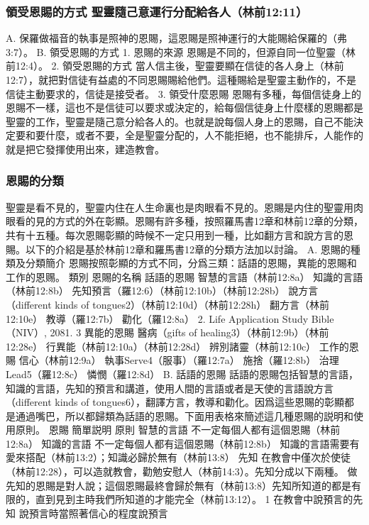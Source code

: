 \subsubsection{領受恩賜的方式 聖靈隨己意運行分配給各人（林前12:11）}
A. 保羅做福音的執事是照神的恩賜，這恩賜是照神運行的大能賜給保羅的（弗3:7）。
B. 領受恩賜的方式
1. 恩賜的來源
恩賜是不同的，但源自同一位聖靈（林前12:4）。
2. 領受恩賜的方式
當人信主後，聖靈要顯在信徒的各人身上（林前12:7），就把對信徒有益處的不同恩賜賜給他們。這種賜給是聖靈主動作的，不是信徒主動要求的，信徒是接受者。
3. 領受什麼恩賜
恩賜有多種，每個信徒身上的恩賜不一樣，這也不是信徒可以要求或決定的，給每個信徒身上什麼樣的恩賜都是聖靈的工作，聖靈是隨己意分給各人的。也就是說每個人身上的恩賜，自己不能決定要和要什麼，或者不要，全是聖靈分配的，人不能拒絕，也不能排斥，人能作的就是把它發揮使用出來，建造教會。
\subsubsection{恩賜的分類}
聖靈是看不見的，聖靈内住在人生命裏也是肉眼看不見的。恩賜是内住的聖靈用肉眼看的見的方式的外在彰顯。恩賜有許多種，按照羅馬書12章和林前12章的分類，共有十五種。每次恩賜彰顯的時候不一定只用到一種，比如翻方言和說方言的恩賜。以下的介紹是基於林前12章和羅馬書12章的分類方法加以討論。
A. 恩賜的種類及分類簡介
恩賜按照彰顯的方式不同，分爲三類：話語的恩賜，異能的恩賜和工作的恩赐。
類別
恩賜的名稱
話語的恩賜
智慧的言語（林前12:8a）
知識的言語（林前12:8b）
先知預言（羅12:6）（林前12:10b）（林前12:28b）
說方言（different kinds of tongues2）（林前12:10d）（林前12:28h）
翻方言（林前12:10e）
教導（羅12:7b）
勸化（羅12:8a）
2. Life Application Study Bible（NIV）, 2081.
3
異能的恩賜
醫病（gifts of healing3）（林前12:9b）（林前12:28e）
行異能（林前12:10a）（林前12:28d）
辨別諸靈（林前12:10c）
工作的恩賜
信心（林前12:9a）
執事Serve4（服事）（羅12:7a）
施捨（羅12:8b）
治理Lead5（羅12:8c）
憐憫（羅12:8d）
B. 話語的恩賜
話語的恩賜包括智慧的言語，知識的言語，先知的預言和講道，使用人間的言語或者是天使的言語說方言（different kinds of tongues6），翻譯方言，教導和勸化。因爲這些恩賜的彰顯都是通過嘴巴，所以都歸類為話語的恩賜。下面用表格來簡述這几種恩賜的説明和使用原則。
恩賜
簡單説明
原則
智慧的言語
不一定每個人都有這個恩賜（林前12:8a）
知識的言語
不一定每個人都有這個恩賜（林前12:8b）
知識的言語需要有愛來搭配（林前13:2）；知識必歸於無有（林前13:8）
先知
在教會中僅次於使徒（林前12:28），可以造就教會，勸勉安慰人（林前14:3）。先知分成以下兩種。
做先知的恩賜是對人說；這個恩賜最終會歸於無有（林前13:8）先知所知道的都是有限的，直到見到主時我們所知道的才能完全（林前13:12）。
1 在教會中說預言的先知 說預言時當照著信心的程度說預言
